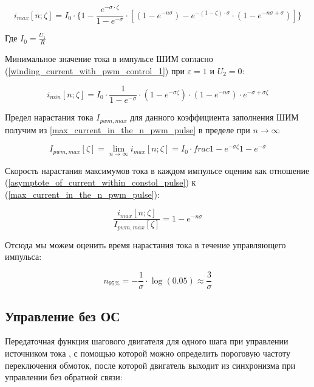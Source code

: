 \begin{equation}
    \label{max_current_in_the_n_pwm_pulse}
    i_{max}[n; \zeta] =
        I_{0} 
            \cdot \{ 1 
                     - \frac{ e^{-\sigma \cdot \zeta} }{ 1 - e^{-\sigma} }
                       \cdot [ (1 - e^{-n\sigma})
                               - e^{ -(1 - \zeta) \cdot \sigma }
                                    \cdot ( 1 - e^{-n\sigma + \sigma} )
                             ]
                  \}
\end{equation}

Где $I_0 = \frac{ U_{1} }{ R }$ 

Минимальное значение тока в импульсе ШИМ согласно (\ref{winding_current_with_pwm_control_1}) при
$\varepsilon=1$ и $U_{2}=0$:

\begin{equation}
    \label{min_current_in_the_n_pwm_pulse}
    i_{min}[n; \zeta] =
        I_{0} 
            \cdot \frac{ 1 }{ 1-e^{-\sigma} }
            \cdot (1 - e^{-\sigma\zeta})
            \cdot (1 - e^{-n\sigma})
            \cdot e^{-\sigma + \sigma\zeta} 
\end{equation}

Предел нарастания тока $I_{pwm,max}$ для данного коэффициента заполнения ШИМ получим из
\ref{max_current_in_the_n_pwm_pulse} в пределе при $n \to \infty$

\begin{equation}
    \label{asymptote_of_current_within_constol_pulse}
    I_{pwm,max}[\zeta]= 
        \lim_{n \to \infty} i_{max} [n; \zeta] = 
            I_{0} \cdot frac{ 1 - e^{-\sigma\zeta} }{ 1 - e^{-\sigma}}
\end{equation}

Скорость нарастания максимумов тока в каждом импульсе оценим как отношение 
(\ref{asymptote_of_current_within_constol_pulse}) к (\ref{max_current_in_the_n_pwm_pulse}):

$$
    \frac{ i_{max}[n; \zeta] }{ I_{pwm,max}[\zeta] } = 1 - e^{-n \sigma}
$$

Отсюда мы можем оценить время нарастания тока в течение управляющего импульса:

$$
    n_{ 95 \% } = - \frac{ 1 }{ \sigma }  \cdot \log{(0.05)} \approx \frac{ 3 }{ \sigma }
$$
\newpage
\subsection{ Управление без ОС }

Передаточная функция шагового двигателя для одного шага при управлении источником тока \cite[гл. 4.2, ф-ла 4.65]{Kenio}, с помощью которой можно определить пороговую частоту переключения обмоток, после которой двигатель выходит из синхронизма при управлении без обратной связи:

